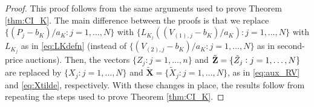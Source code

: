 \begin{proof}
This proof follows from the same arguments used to prove Theorem \ref{thm:CI_K}. The main difference between the proofs is that we replace $\{(P_j-b_K)/a_K:j=1,\dots,N\}$ with $\{L_{K_j}((V_{(1),j}-b_K)/a_K):j=1,\dots,N\}$ with $L_{K_j}$ as in \eqref{eq:LKdefn} (instead of $\{(V_{(2),j}-b_K)/a_K:j=1,\dots,N\}$ as in second-price auctions). Then, the vectors $\{Z_j:j=1,\dots,n\}$ and $\tilde{\bf Z}=\{\tilde{Z}_{j}:j=1,\dots ,N\}$ are replaced by $\{X_j:j=1,\dots,N\}$ and $\mathbf{\tilde{X}}=\{\tilde{X}_{j}:j=1,\dots ,N\}$, as in \eqref{eq:aux_RV} and \eqref{eq:Xtilde}, respectively. With these changes in place, the results follow from repeating the steps used to prove Theorem \ref{thm:CI_K}.
%

\end{proof}
